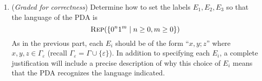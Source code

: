 \documentclass[12pt, oneside]{article}
\newcommand{\gradeCorrect}{({\it Graded for correctness}) }
\newcommand{\REP}{\textsc{Rep}}
\begin{document}
\begin{enumerate}
\begin{enumerate}
    \item\gradeCorrect Determine how to set the labels $E_1, E_2, E_3$ so that the language of the PDA is 
    \[
    \REP(\{0^n1^m \mid n \ge 0, m \ge 0\})
    \]
    As in the previous part, each $E_i$ should be of the form ``$x,y; z$'' where $x, y, z \in \Gamma_{\varepsilon}$ (recall $\Gamma_{\varepsilon} = \Gamma \cup \{\varepsilon\}$).
    In addition to specifying each $E_i$, a complete justification 
    will include a precise description of why this choice of $E_i$
    means that the PDA recognizes the language indicated.

\end{enumerate}

\end{enumerate}
\end{document}
